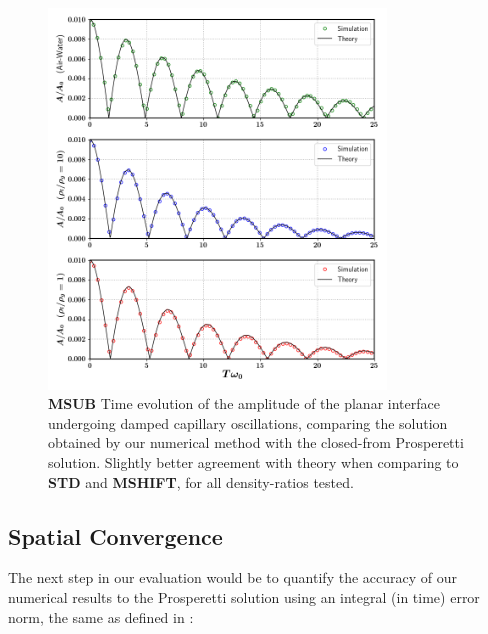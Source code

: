 \begin{figure}[h!]
    \centering
    \includegraphics[width = 0.8\textwidth]{plots/capwave/compare_sagar.png}
	\caption{\textbf{MSUB} Time evolution of the amplitude of the planar interface undergoing damped capillary oscillations, comparing the solution obtained by our numerical method with the closed-from Prosperetti solution. Slightly better agreement with theory when comparing to \textbf{STD} and \textbf{MSHIFT}, for all density-ratios tested. }
    \label{capwave_sagar}
\end{figure}


\subsection*{Spatial Convergence}

The next step in our evaluation would be to quantify the accuracy of our numerical results to the Prosperetti solution using an integral (in time) error norm, the same as defined in \cite{popinet2009accurate} :       


